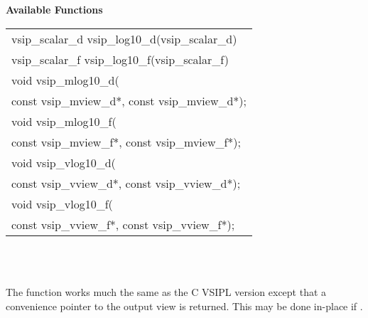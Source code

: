\\\cvsiplh
\\ \hspace*{.8cm} \vspace*{.1cm} \textbf{Available Functions }
\\ \hspace*{1.1cm} {
\ttfamily
\begin{tabular}[H]{l}
vsip\_scalar\_d vsip\_log10\_d(vsip\_scalar\_d)\\
vsip\_scalar\_f vsip\_log10\_f(vsip\_scalar\_f)\\
void vsip\_mlog10\_d(\\*\hspace{1cm}const vsip\_mview\_d*, const vsip\_mview\_d*);\\
void vsip\_mlog10\_f(\\*\hspace{1cm}const vsip\_mview\_f*, const vsip\_mview\_f*);\\
void vsip\_vlog10\_d(\\*\hspace{1cm}const vsip\_vview\_d*, const vsip\_vview\_d*);\\
void vsip\_vlog10\_f(\\*\hspace{1cm}const vsip\_vview\_f*, const vsip\_vview\_f*);\\
\end{tabular}
}
\\\pyjvsiph
{}
\\ \hspace*{1.2cm}\parbox{10.8cm}{\vspace*{.1cm}The  function works much the same as the C VSIPL version except that a convenience pointer to the output view is returned. This may be done in-place if .}
